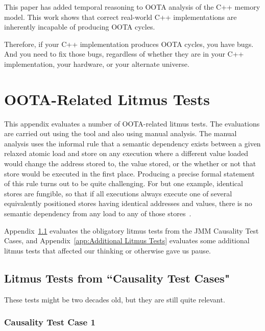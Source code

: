 \documentclass[10]{article}
\begin{document}
This paper has added temporal reasoning to OOTA analysis of the C++
memory model.
This work shows that correct real-world C++ implementations are inherently
incapable of producing OOTA cycles.

Therefore, if your C++ implementation produces OOTA cycles, you have bugs.
And you need to fix those bugs, regardless of whether they are in your
C++ implementation, your hardware, or your alternate universe.

\clearpage
\appendix

\section{OOTA-Related Litmus Tests}
\label{app:OOTA-Related Litmus Tests}

This appendix evaluates a number of OOTA-related litmus tests.
The evaluations are carried out using the  tool and also
using manual analysis.
The manual analysis uses the informal rule that a semantic dependency
exists between a given relaxed atomic load and store on any execution
where a different value loaded would change the address stored to, the
value stored, or the whether or not that store would be executed in
the first place.
Producing a precise formal statement of this rule turns out to be quite
challenging.
For but one example, identical stores are fungible, so that if all
executions always execute one of several equivalently positioned stores
having identical addresses and values, there is no semantic dependency
from any load to any of those stores~\cite{Howells2009membartxt}.

Appendix~\ref{app:Litmus Tests from “Causality Test Cases"}
evaluates the obligatory litmus tests from the JMM Causality Test
Cases, and
Appendix~\ref{app:Additional Litmus Tests}
evaluates some additional litmus tests that affected our thinking or
otherwise gave us pause.

\subsection{Litmus Tests from “Causality Test Cases"}
\label{app:Litmus Tests from “Causality Test Cases"}

These tests might be two decades old, but they are still quite
relevant.

\subsubsection{Causality Test Case 1}
\label{app:Causality Test Case 1}
\end{document}
